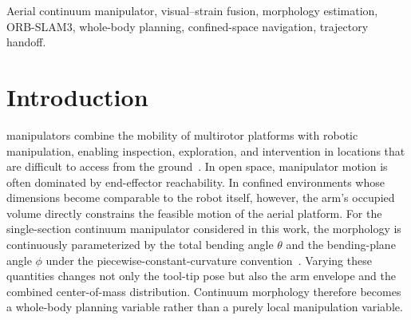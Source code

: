 \documentclass[journal,twoside]{IEEEtran}
\begin{document}
\begin{abstract}
Complementary module-level studies isolate sensing robustness and planning performance. Staged visual-degradation tests show that fusion weights migrate smoothly toward the strain branch when ORB observations deteriorate or fail. In a 90-scenario paired PX4/Gazebo closed-loop planning benchmark with second-order morphology response, Rolling-WB completes 89/90 tasks, corresponding to a 98.9\% success rate and a 23.3-percentage-point improvement over the best baseline. In hard scenarios, the success rate reaches 96.7\%, compared with 40.0\% for the best baseline. The planning-time P95 is 3.70~s with no planning deadline miss. A paired handoff ablation further shows a 72.8\% reduction in median translational jerk energy per unit path length relative to position-only switching.
\end{abstract}

\begin{IEEEkeywords}
Aerial continuum manipulator, visual--strain fusion, morphology estimation, ORB-SLAM3, whole-body planning, confined-space navigation, trajectory handoff.
\end{IEEEkeywords}

\section{Introduction}

 manipulators combine the mobility of multirotor platforms with robotic manipulation, enabling inspection, exploration, and intervention in locations that are difficult to access from the ground~\cite{ollero2022survey}. In open space, manipulator motion is often dominated by end-effector reachability. In confined environments whose dimensions become comparable to the robot itself, however, the arm's occupied volume directly constrains the feasible motion of the aerial platform. For the single-section continuum manipulator considered in this work, the morphology is continuously parameterized by the total bending angle $\theta$ and the bending-plane angle $\phi$ under the piecewise-constant-curvature convention~\cite{webster2010pcc}. Varying these quantities changes not only the tool-tip pose but also the arm envelope and the combined center-of-mass distribution. Continuum morphology therefore becomes a whole-body planning variable rather than a purely local manipulation variable.
\end{document}
